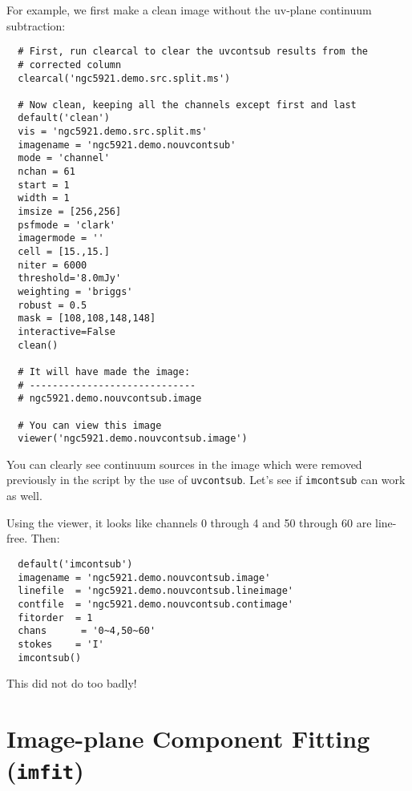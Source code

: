 For example, we first make a clean image without the uv-plane continuum
subtraction:
\small
\begin{verbatim}
  # First, run clearcal to clear the uvcontsub results from the
  # corrected column
  clearcal('ngc5921.demo.src.split.ms')
  
  # Now clean, keeping all the channels except first and last
  default('clean')
  vis = 'ngc5921.demo.src.split.ms'
  imagename = 'ngc5921.demo.nouvcontsub'
  mode = 'channel'
  nchan = 61
  start = 1
  width = 1
  imsize = [256,256]
  psfmode = 'clark'
  imagermode = ''
  cell = [15.,15.]
  niter = 6000
  threshold='8.0mJy'
  weighting = 'briggs'
  robust = 0.5
  mask = [108,108,148,148]
  interactive=False
  clean()
  
  # It will have made the image:
  # -----------------------------
  # ngc5921.demo.nouvcontsub.image

  # You can view this image
  viewer('ngc5921.demo.nouvcontsub.image')
\end{verbatim}
\normalsize
You can clearly see continuum sources in the image which were removed
previously in the script by the use of {\tt uvcontsub}.  Let's see
if {\tt imcontsub} can work as well.

Using the viewer, it looks like channels 0 through 4 and
50 through 60 are line-free.  Then:
\small
\begin{verbatim}
  default('imcontsub')
  imagename = 'ngc5921.demo.nouvcontsub.image'
  linefile  = 'ngc5921.demo.nouvcontsub.lineimage'
  contfile  = 'ngc5921.demo.nouvcontsub.contimage'
  fitorder  = 1
  chans      = '0~4,50~60'
  stokes    = 'I'
  imcontsub()
\end{verbatim}
\normalsize
This did not do too badly!

\section{Image-plane Component Fitting ({\tt imfit})}
\label{section:analysis.imfit}

